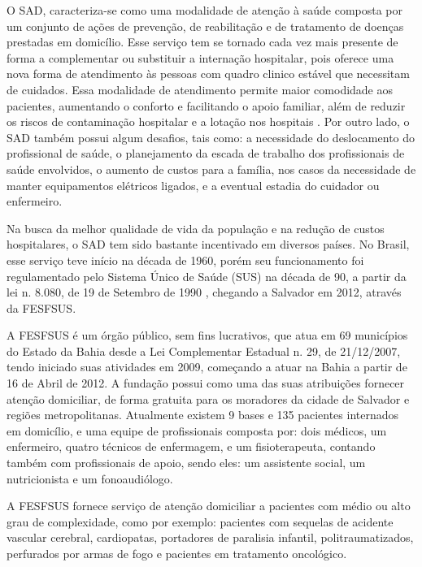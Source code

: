 
O \ac{SAD}, caracteriza-se como uma modalidade de atenção à saúde composta por um conjunto de ações de prevenção, de reabilitação e de tratamento de doenças prestadas em domicílio.
Esse serviço tem se tornado cada vez mais presente de forma a complementar ou substituir a internação hospitalar, pois oferece uma nova forma de atendimento às pessoas com quadro clinico estável que necessitam de cuidados.
Essa modalidade de atendimento permite maior comodidade aos pacientes, aumentando o conforto e facilitando o apoio familiar, além de reduzir os riscos de contaminação hospitalar e a lotação nos hospitais \cite{Kergosien:2009}.
Por outro lado, o \ac{SAD} também possui algum desafios, tais como: a necessidade do deslocamento do profissional de saúde, o planejamento da escada de trabalho dos profissionais de saúde envolvidos, o aumento de custos para a família, nos casos da necessidade de manter equipamentos elétricos ligados, e a eventual estadia do cuidador ou enfermeiro.%

Na busca da melhor qualidade de vida da população e na redução de custos hospitalares, o \ac{SAD} tem sido bastante incentivado em diversos países. 
No Brasil, esse serviço teve início na década de 1960, porém seu funcionamento foi regulamentado pelo Sistema Único de Saúde (SUS) na década de 90, a partir da lei n. 8.080, de 19 de Setembro de 1990 \cite{Silva:2010}, chegando a Salvador em 2012, através da \ac{FESFSUS}. 

A \ac{FESFSUS} é um órgão público, sem fins lucrativos, que atua em 69 municípios do Estado da Bahia desde a Lei Complementar Estadual n. 29, de 21/12/2007, tendo iniciado suas atividades em 2009, começando a atuar na Bahia a partir de 16 de Abril de 2012. A fundação possui como uma das suas atribuições fornecer atenção domiciliar, de forma gratuita para os moradores da cidade de Salvador e regiões metropolitanas. Atualmente existem 9 bases e 135 pacientes internados em domicílio, e uma equipe de profissionais composta por: dois médicos, um enfermeiro, quatro técnicos de enfermagem, e um fisioterapeuta, contando também com profissionais de apoio, sendo eles: um assistente social, um nutricionista e um fonoaudiólogo.

A \ac{FESFSUS} fornece serviço de atenção domiciliar a pacientes com médio ou alto grau de complexidade, como por exemplo: pacientes com sequelas de acidente vascular cerebral, cardiopatas, portadores de paralisia infantil, politraumatizados, perfurados por armas de fogo e pacientes em tratamento oncológico.

